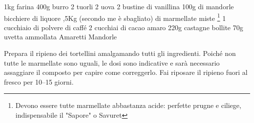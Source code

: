 \begin{ingreds}
	1kg farina
	400g burro
	2 tuorli
	2 uova
	2 bustine di vanillina
	100g di mandorle
	 bicchiere di liquore
\columnbreak
	,5Kg (secondo me è sbagliato) di marmellate miste  \footnote{Devono essere tutte marmellate abbastanza acide: perfette prugne e ciliege, indispensabile il "Sapore" o Savuret}
	1 cucchiaio di polvere di caffé 
	2 cucchiai di cacao amaro 
	220g castagne bollite 
	70g uvetta ammollata 
	Amaretti 
	Mandorle 



\end{ingreds}

\begin{method}
Prepara il ripieno dei tortellini amalgamando tutti gli ingredienti. Poiché non tutte le marmellate sono uguali, le dosi sono indicative e sarà necessario assaggiare il composto per capire come correggerlo. Fai riposare il ripieno fuori al fresco per 10--15 giorni.


\end{method}




